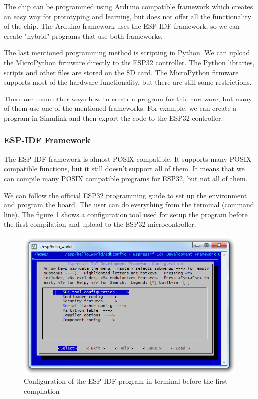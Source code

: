 The chip can be programmed using Arduino compatible framework \cite{espressif:ArduinoCore} which creates an easy way for prototyping and learning, but does not offer all the functionality of the chip. The Arduino framework uses the ESP-IDF framework, so we can create "hybrid" programs that use both frameworks.

The last mentioned programming method is scripting in Python. We can upload the MicroPython \cite{MicroPython} firmware directly to the ESP32 controller. The Python libraries, scripts and other files are stored on the SD card. The MicroPython firmware supports most of the hardware functionality, but there are still some restrictions.

There are some other ways how to create a program for this hardware, but many of them use one of the mentioned frameworks. For example, we can create a program in Simulink and then export the code to the ESP32 controller. \cite{ArduinoSimulink}

\subsubsection{ESP-IDF Framework}
The ESP-IDF framework is almost POSIX compatible. \cite{ESP32posix} It supports many POSIX compatible functions, but it still doesn't support all of them. It means that we can compile many POSIX compatible programs for ESP32, but not all of them.

We can follow the official ESP32 programming guide \cite{ESP32programmingGuide} to set up the environment and program the board. The user can do everything from the terminal (command line). The figure \ref{ESP32menuconfig} shows a configuration tool used for setup the program before the first compilation and upload to the ESP32 microcontroller.

\begin{figure}
	\centering
	\label{ESP32menuconfig}
	\caption{Configuration of the ESP-IDF program in terminal before the first compilation}
	\includegraphics[width=16cm]{img/ESP32menuconfig.png}
\end{figure}


